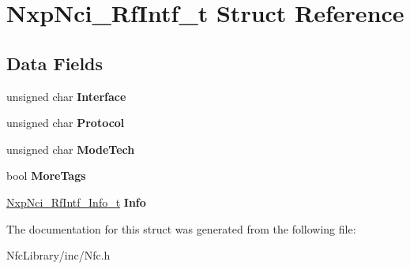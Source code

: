 \hypertarget{struct_nxp_nci___rf_intf__t}{}\section{Nxp\+Nci\+\_\+\+Rf\+Intf\+\_\+t Struct Reference}
\label{struct_nxp_nci___rf_intf__t}
\subsection*{Data Fields}
\begin{DoxyCompactItemize}
\item 
\mbox{\label{struct_nxp_nci___rf_intf__t_a6cb4d87aa1568353733376d3e7bfe778}} 
unsigned char {\bfseries Interface}
\item 
\mbox{\label{struct_nxp_nci___rf_intf__t_a0f54060a289345c47707324039134005}} 
unsigned char {\bfseries Protocol}
\item 
\mbox{\label{struct_nxp_nci___rf_intf__t_a6002c48b66d9bd293f20eaa10d0f0a78}} 
unsigned char {\bfseries Mode\+Tech}
\item 
\mbox{\label{struct_nxp_nci___rf_intf__t_acfb500e31681b23fcd618bfe7bc407aa}} 
bool {\bfseries More\+Tags}
\item 
\mbox{\label{struct_nxp_nci___rf_intf__t_a00f809ae165d88bbc2071625ff7ea5c1}} 
\mbox{\hyperlink{union_nxp_nci___rf_intf___info__t}{Nxp\+Nci\+\_\+\+Rf\+Intf\+\_\+\+Info\+\_\+t}} {\bfseries Info}
\end{DoxyCompactItemize}


The documentation for this struct was generated from the following file\+:\begin{DoxyCompactItemize}
\item 
Nfc\+Library/inc/Nfc.\+h\end{DoxyCompactItemize}
